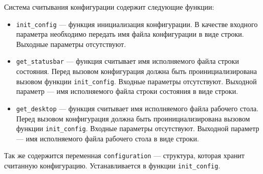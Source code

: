 \documentclass[10pt,a4paper]{report}
\begin{document}
Система считывания конфигурации содержит следующие функции:
\begin{itemize}
\item \texttt{init\_config} --- функция инициализация конфигурации. В качестве входного параметра необходимо передать имя файла конфигурации в виде строки. Выходные параметры отсутствуют.
\item \texttt{get\_statusbar} --- функция считывает имя исполняемого файла строки состояния. Перед вызовом конфигурация должна быть проинициализирована вызовом функции \texttt{init\_config}. Входные параметры отсутствуют. Выходной параметр --- имя исполняемого файла строки состояния в виде строки.
\item \texttt{get\_desktop} --- функция считывает имя исполняемого файла рабочего стола. Перед вызовом конфигурация должна быть проинициализирована вызовом функции \texttt{init\_config}. Входные параметры отсутствуют. Выходной параметр --- имя исполняемого файла рабочего стола в виде строки.
\end{itemize}

Так же содержится переменная \texttt{configuration} --- структура, которая хранит считанную конфигурацию. Устанавливается в функции \texttt{init\_config}.
\end{document}
